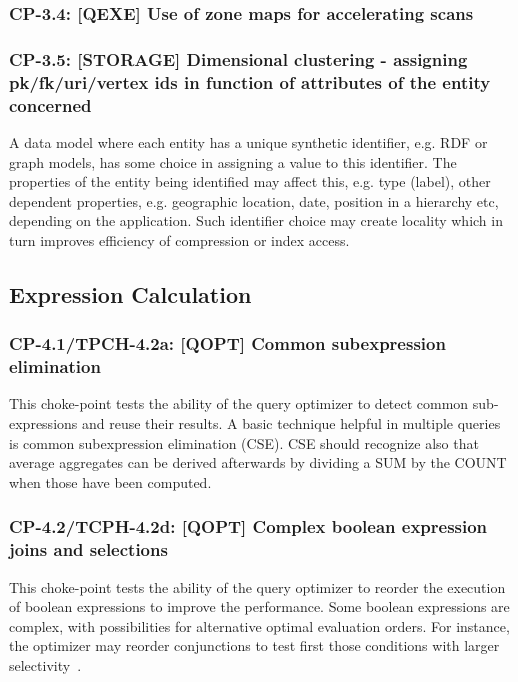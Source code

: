 \subsubsection{CP-3.4: [QEXE] Use of zone maps for accelerating scans}
\label{choke_point_3.4}

\subsubsection{CP-3.5: [STORAGE] Dimensional clustering - assigning pk/fk/uri/vertex ids in function of attributes of the entity concerned}
\label{choke_point_3.5}
A data model where each entity has a unique synthetic identifier, e.g. RDF or graph models, has some choice in assigning a value to this identifier. The properties of the entity being identified may affect this, e.g. type (label), other dependent properties, e.g. geographic location, date, position in a hierarchy etc, depending on the application. Such identifier choice may create locality which in turn improves efficiency of compression or index access.

\subsection{Expression Calculation}

\subsubsection{CP-4.1/TPCH-4.2a: [QOPT]  Common subexpression elimination}
\label{choke_point_4.1}
This choke-point tests the ability of the query optimizer to detect common sub-expressions and reuse their results. A basic technique helpful in multiple queries is common subexpression elimination (CSE).
CSE should recognize also that average aggregates can be derived afterwards by dividing a SUM by the COUNT when those have been computed.

\subsubsection{CP-4.2/TCPH-4.2d: [QOPT]  Complex boolean expression joins and selections}
\label{choke_point_4.2}
This choke-point tests the ability of the query optimizer to reorder the execution of boolean expressions to improve the performance. Some boolean expressions are complex, with possibilities for alternative optimal evaluation orders.
For instance, the optimizer may reorder conjunctions to test first those conditions with larger selectivity~\cite{DBLP:conf/vldb/Moerkotte98}.

